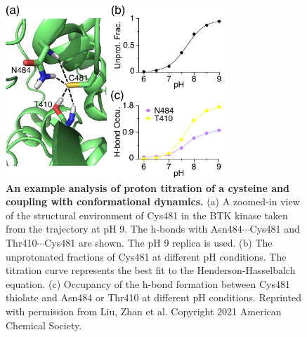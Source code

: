 \begin{figure}[htb!]
    \centering
    \includegraphics[width=3.3in]{figs/analysis_example.pdf}
    \caption{\textbf{An example analysis of proton titration of a cysteine and coupling with conformational dynamics.}
    (a) A zoomed-in view of the structural environment of Cys481 in the BTK kinase taken from the trajectory at pH 9. 
    The h-bonds with Asn484$\cdots$Cys481 and Thr410$\cdots$Cys481 are shown. 
    The pH 9 replica is used. 
    (b) The unprotonated fractions of Cys481 at different pH conditions. The titration curve represents the best fit to the Henderson-Hasselbalch equation. 
    (c) Occupancy of the h-bond formation between Cys481 thiolate and Asn484 or Thr410
    at different pH conditions. 
  Reprinted with permission from Liu, Zhan et al.\cite{Liu_Shen_2021_J.Med.Chem.} 
    Copyright {2021} American Chemical Society.
    }
\label{Fig:analysis}
\end{figure}
 



